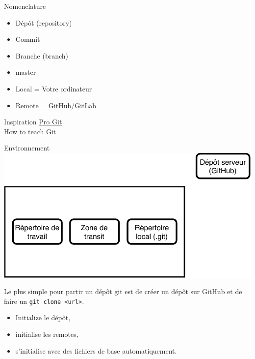 \documentclass[11pt]{beamer}
\begin{document}
\begin{frame}{Nomenclature}
	\begin{itemize}
		\item Dépôt (repository)
		\item Commit
		\item Branche (branch)
		\item master
		\item Local = Votre ordinateur
		\item Remote = GitHub/GitLab
	\end{itemize}
\end{frame}

\begin{frame}{Inspiration}
\centering
\href{https://git-scm.com/book/en/v2}{Pro Git} \\
\href{https://rachelcarmena.github.io/2018/12/12/how-to-teach-git.html}{How to teach Git}
\end{frame}

\begin{frame}{Environnement}
	\includegraphics[width=0.95\linewidth,height=0.95\textheight,keepaspectratio]{env.pdf}
\end{frame}

\begin{frame}[fragile]
	Le plus simple pour partir un dépôt git est de créer un dépôt sur GitHub et de faire un \verb|git clone <url>|.
	
	\begin{itemize}[<+->]
		\item Initialize le dépôt,
		\item initialise les remotes,
		\item   s'initialise avec des fichiers de base automatiquement.
	\end{itemize}
\end{frame}
\end{document}
